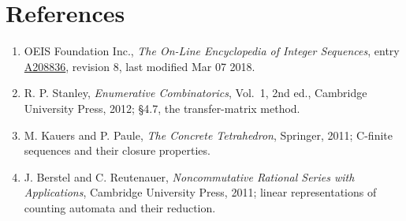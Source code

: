 \documentclass[11pt]{article}
\theoremstyle{definition}
\begin{document}
\section{References}

\begin{enumerate}

\item OEIS Foundation Inc., \emph{The On-Line Encyclopedia of Integer Sequences}, entry \href{https://oeis.org/A208836}{A208836}, revision 8, last modified Mar 07 2018.

\item R. P. Stanley, \emph{Enumerative Combinatorics}, Vol.~1, 2nd ed., Cambridge University Press, 2012; \S4.7, the transfer-matrix method.

\item M. Kauers and P. Paule, \emph{The Concrete Tetrahedron}, Springer, 2011; C-finite sequences and their closure properties.

\item J. Berstel and C. Reutenauer, \emph{Noncommutative Rational Series with Applications}, Cambridge University Press, 2011; linear representations of counting automata and their reduction.

\end{enumerate}
\end{document}
